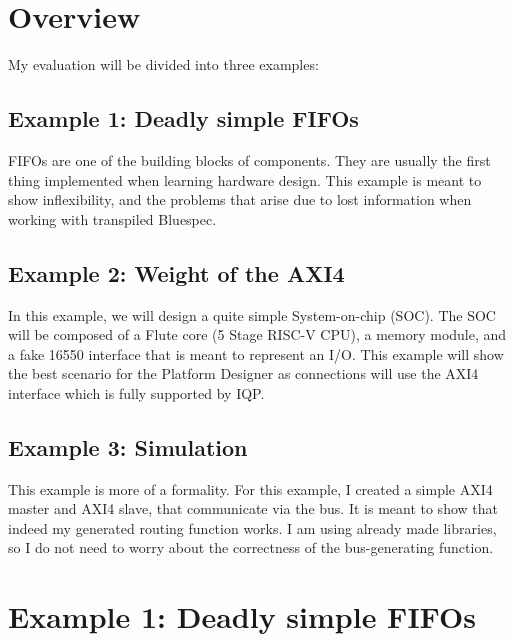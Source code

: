 \documentclass[12pt]{report}
\begin{document}
\section{Overview} 
My evaluation will be divided into three examples: 
\subsection{Example 1: Deadly simple FIFOs} FIFOs are one of the building blocks of components. 
They are usually the first thing implemented when learning hardware design.
This example is meant to show inflexibility, and the problems that arise due to lost information when working with transpiled Bluespec. 
\subsection{Example 2: Weight of the AXI4} 
In this example, we will design a quite simple System-on-chip (SOC). 
The SOC will be composed of a Flute core (5 Stage RISC-V CPU)\cite{Flute core}, a memory module, and a fake 16550 interface that is meant to represent an I/O. 
This example will show the best scenario for the Platform Designer as connections will use the AXI4 interface which is fully supported by IQP.
\subsection{Example 3: Simulation} 
This example is more of a formality. 
For this example, I created a simple AXI4 master and AXI4 slave, that communicate via the bus. 
It is meant to show that indeed my generated routing function works. 
I am using already made libraries, so I do not need to worry about the correctness of the bus-generating function. 
\section{Example 1: Deadly simple FIFOs} 
\end{document}
